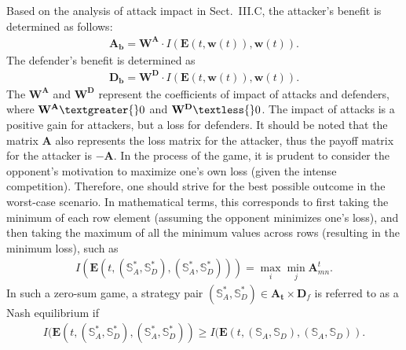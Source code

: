 \documentclass[lettersize,journal]{IEEEtran}
\begin{document}
Based on the analysis of attack impact in Sect.~III.C, the attacker's benefit is determined as follows: 
\begin{equation}
\label{attackbenefit}
\begin{split}
\mathbf{A_b}= \mathbf{W^{A}}\cdot I(\bm{E}(t,\bm{w}(t)),\bm{w}(t)).
\end{split}
\end{equation}
The defender's benefit is determined as
\begin{equation}
\label{defenderbenefit}
\begin{split}
\mathbf{D_b}= \mathbf{W^{D}}\cdot I(\bm{E}(t,\bm{w}(t)),\bm{w}(t)).
\end{split}
\end{equation}
The $\mathbf{W^{A}}$ and $\mathbf{W^{D}}$ represent the coefficients of impact of attacks and defenders, where $\mathbf{W^{A}} \textgreater{} 0$ and $\mathbf{W^{D}} \textless{} 0$. The impact of attacks is a positive gain for attackers, but a loss for defenders. It should be noted that the matrix $\mathbf{A}$ also represents the loss matrix for the attacker, thus the payoff matrix for the attacker is $-\mathbf{A}$. In the process of the game, it is prudent to consider the opponent's motivation to maximize one's own loss (given the intense competition). Therefore, one should strive for the best possible outcome in the worst-case scenario. In mathematical terms, this corresponds to first taking the minimum of each row element (assuming the opponent minimizes one's loss), and then taking the maximum of all the minimum values across rows (resulting in the minimum loss), such as  
\begin{equation}
\label{sum-zero}
\begin{split}
I(\bm{E}(t,(\mathbb{S}_{A}^*,\mathbb{S}_{D}^*),(\mathbb{S}_{A}^*,\mathbb{S}_{D}^*))) = 
\max_{i} \min_{j} \mathbf{A}^t_{mn}.
\end{split}
\end{equation}
In such a zero-sum game, a strategy pair $(\mathbb{S}_{A}^*, \mathbb{S}_{D}^*) \in \mathbf{A_t} \times \mathbf{D}_f$ is referred to as a Nash equilibrium if 
\begin{equation}
\label{nash equilibrium}
\begin{split}
I(\bm{E}(t,(\mathbb{S}_{A}^*,\mathbb{S}_{D}^*),(\mathbb{S}_{A}^*,\mathbb{S}_{D}^*)) \geq I(\bm{E}(t,(\mathbb{S}_{A},\mathbb{S}_{D}),(\mathbb{S}_{A},\mathbb{S}_{D})).
\end{split}
\end{equation}
\par
\end{document}
